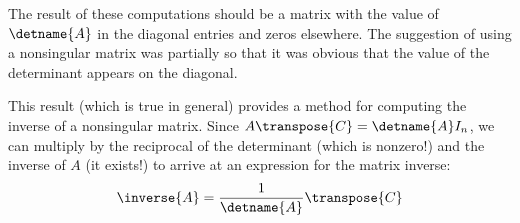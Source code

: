 The result of these computations should be a matrix with the value of $\detname{A}$ in the diagonal entries and zeros elsewhere.  The suggestion of using a nonsingular matrix was partially so that it was obvious that the value of the determinant appears on the diagonal.\par
%
This result (which is true in general) provides a method for computing the inverse of a nonsingular matrix.  Since $A\transpose{C}=\detname{A}I_n$, we can multiply by the reciprocal of the determinant (which is nonzero!) and the inverse of $A$ (it exists!) to arrive at an expression for the matrix inverse:
%
\begin{equation*}
\inverse{A}=\frac{1}{\detname{A}}\transpose{C}
\end{equation*}
%
